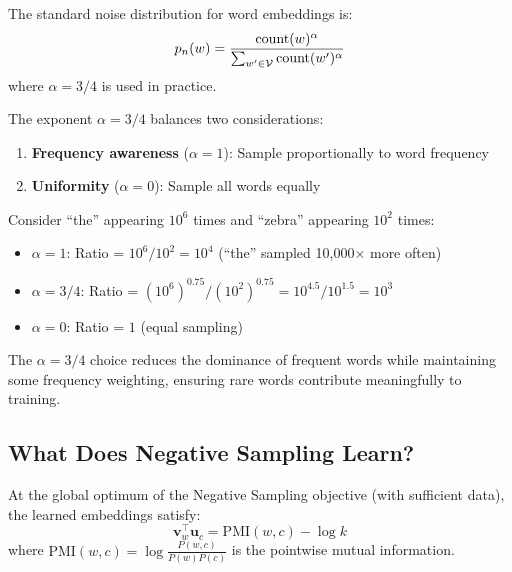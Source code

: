 \begin{notechapter}
\begin{definition}
The standard noise distribution for word embeddings is:
\begin{equation}
p_n(w) = \frac{\text{count}(w)^\alpha}{\sum_{w' \in \mathcal{V}} \text{count}(w')^\alpha}
\end{equation}
where $\alpha = 3/4$ is used in practice.
\end{definition}

\begin{proposition}[Why $\alpha = 3/4$?]
The exponent $\alpha = 3/4$ balances two considerations:
\begin{enumerate}[label=(\roman*)]
    \item \textbf{Frequency awareness} ($\alpha = 1$): Sample proportionally to word frequency
    \item \textbf{Uniformity} ($\alpha = 0$): Sample all words equally
\end{enumerate}
\end{proposition}

\begin{example}
Consider ``the'' appearing $10^6$ times and ``zebra'' appearing $10^2$ times:
\begin{itemize}
    \item $\alpha = 1$: Ratio = $10^6 / 10^2 = 10^4$ (``the'' sampled 10,000$\times$ more often)
    \item $\alpha = 3/4$: Ratio = $(10^6)^{0.75} / (10^2)^{0.75} = 10^{4.5} / 10^{1.5} = 10^3$ 
    \item $\alpha = 0$: Ratio = $1$ (equal sampling)
\end{itemize}
The $\alpha = 3/4$ choice reduces the dominance of frequent words while maintaining some frequency weighting, ensuring rare words contribute meaningfully to training.
\end{example}

\subsection{What Does Negative Sampling Learn?}

\begin{theorem}
\label{contrastive-rigorous:thm:ns_pmi}
At the global optimum of the Negative Sampling objective (with sufficient data), the learned embeddings satisfy:
\begin{equation}
\bm{v}_w^\top \bm{u}_c = \text{PMI}(w, c) - \log k
\end{equation}
where $\text{PMI}(w, c) = \log \frac{P(w, c)}{P(w)P(c)}$ is the pointwise mutual information.
\end{theorem}


\end{notechapter}
